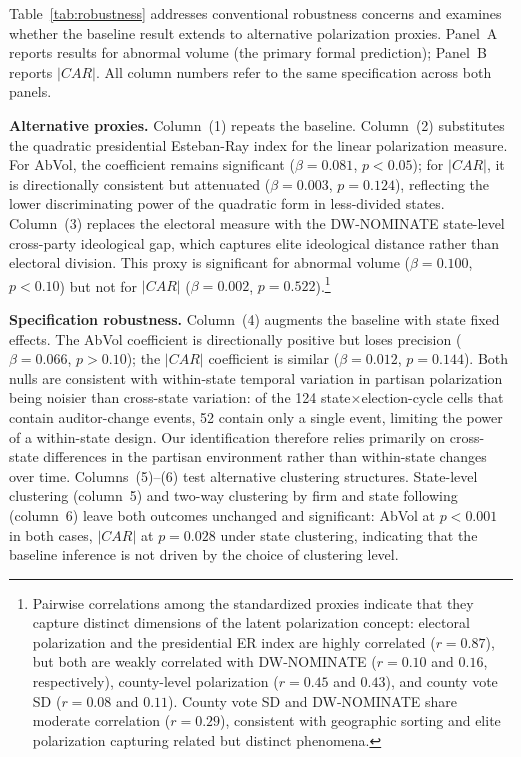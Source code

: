\documentclass[12pt]{article}
\begin{document}
Table~\ref{tab:robustness} addresses conventional robustness concerns and
examines whether the baseline result extends to alternative polarization
proxies. Panel~A reports results for abnormal volume (the primary formal
prediction); Panel~B reports $|CAR|$. All column numbers refer to the
same specification across both panels.

\textbf{Alternative proxies.}
Column~(1) repeats the baseline. Column~(2) substitutes the quadratic
presidential Esteban-Ray index for the linear polarization measure.
For AbVol, the coefficient remains significant ($\beta = 0.081$, $p < 0.05$);
for $|CAR|$, it is directionally consistent but attenuated
($\beta = 0.003$, $p = 0.124$), reflecting the lower discriminating power
of the quadratic form in less-divided states. Column~(3) replaces the
electoral measure with the DW-NOMINATE state-level cross-party ideological
gap, which captures elite ideological distance rather than electoral
division. This proxy is significant for abnormal volume
($\beta = 0.100$, $p < 0.10$) but not for $|CAR|$
($\beta = 0.002$, $p = 0.522$).\footnote{Pairwise
correlations among the standardized proxies indicate that they capture
distinct dimensions of the latent polarization concept: electoral
polarization and the presidential ER index are highly correlated ($r = 0.87$), but
both are weakly correlated with DW-NOMINATE ($r = 0.10$ and $0.16$,
respectively), county-level polarization ($r = 0.45$ and $0.43$),
and county vote SD ($r = 0.08$ and $0.11$). County vote SD and
DW-NOMINATE share moderate correlation ($r = 0.29$), consistent with
geographic sorting and elite polarization capturing related but distinct
phenomena.}

\textbf{Specification robustness.}
Column~(4) augments the baseline with state fixed effects. The AbVol
coefficient is directionally positive but loses precision
($\beta = 0.066$, $p > 0.10$); the $|CAR|$ coefficient is similar
($\beta = 0.012$, $p = 0.144$). Both nulls are consistent with
within-state temporal variation in partisan polarization being noisier
than cross-state variation: of the 124 state$\times$election-cycle cells
that contain auditor-change events, 52 contain only a single event,
limiting the power of a within-state design. Our identification
therefore relies primarily on cross-state differences in the partisan
environment rather than within-state changes over time.
Columns~(5)--(6) test alternative clustering structures. State-level
clustering (column~5) and two-way clustering by firm and state following
\citet{cameron2011} (column~6) leave both outcomes unchanged and
significant: AbVol at $p < 0.001$ in both cases, $|CAR|$ at $p = 0.028$
under state clustering,
indicating that the baseline inference is not driven by the choice of
clustering level.
\end{document}
